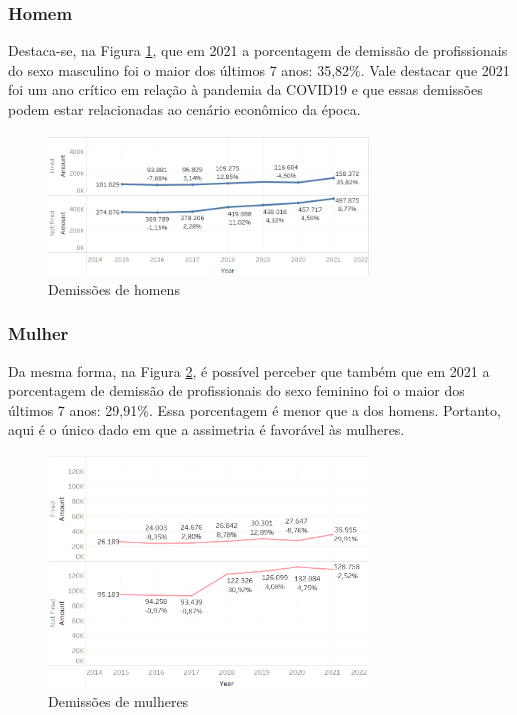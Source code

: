 \subsubsection{Homem}

Destaca-se, na Figura \ref{fig_4_qnt_h_demit}, que em 2021 a porcentagem de demissão de profissionais do sexo masculino foi o maior dos últimos 7 anos: 35,82\%. Vale destacar que 2021 foi um ano crítico em relação à pandemia da COVID19 e que essas demissões podem estar relacionadas ao cenário econômico da época. 

\begin{figure}[htbp]
	\centerline{
		\includegraphics[width=85mm]{assets/4_qnt_h_demit.PNG}
	}
	\caption{Demissões de homens}
	\label{fig_4_qnt_h_demit}
\end{figure}

\subsubsection{Mulher}

Da mesma forma, na Figura \ref{fig_4_qnt_m_demit}, é possível perceber que também que em 2021 a porcentagem de demissão de profissionais do sexo feminino foi o maior dos últimos 7 anos: 29,91\%. Essa porcentagem é menor que a dos homens. Portanto, aqui é o único dado em que a assimetria é favorável às mulheres. 

\begin{figure}[htbp]
	\centerline{
		\includegraphics[width=85mm]{assets/4_qnt_m_demit.PNG}
	}
	\caption{Demissões de mulheres}
	\label{fig_4_qnt_m_demit}
\end{figure}

